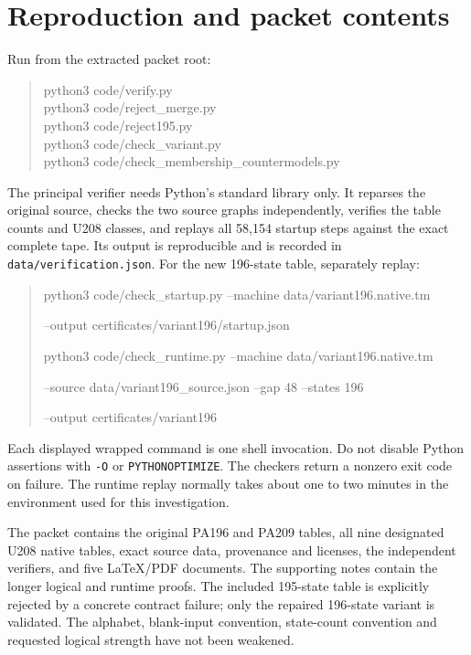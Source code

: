 \documentclass[11pt,letterpaper]{article}
\newcommand{\file}[1]{\texttt{\nolinkurl{#1}}}
\begin{document}
\section{Reproduction and packet contents}

Run from the extracted packet root:
\begin{quote}\ttfamily
python3 code/verify.py\\
python3 code/reject\_merge.py\\
python3 code/reject195.py\\
python3 code/check\_variant.py\\
python3 code/check\_membership\_countermodels.py
\end{quote}
The principal verifier needs Python's standard library only. It reparses
the original source, checks the two source graphs independently, verifies
the table counts and U208 classes, and replays all 58,154 startup steps
against the exact complete tape. Its output is reproducible and is recorded
in \file{data/verification.json}.
For the new 196-state table, separately replay:
\begin{quote}\small\ttfamily
python3 code/check\_startup.py --machine data/variant196.native.tm\par
\hspace*{1em}--output certificates/variant196/startup.json\par\medskip
python3 code/check\_runtime.py --machine data/variant196.native.tm\par
\hspace*{1em}--source data/variant196\_source.json --gap 48 --states 196\par
\hspace*{1em}--output certificates/variant196
\end{quote}
Each displayed wrapped command is one shell invocation. Do not disable
Python assertions with \file{-O} or \file{PYTHONOPTIMIZE}. The checkers
return a nonzero exit code on failure. The runtime replay normally takes
about one to two minutes in the environment used for this investigation.

The packet contains the original PA196 and PA209 tables, all nine designated
U208 native tables, exact source data, provenance and licenses, the
independent verifiers, and five LaTeX/PDF documents. The supporting notes contain the longer logical and runtime proofs.
The included 195-state table is explicitly rejected by a concrete
contract failure; only the repaired 196-state variant is validated.
The alphabet, blank-input convention, state-count convention and requested
logical strength have not been weakened.
\end{document}
